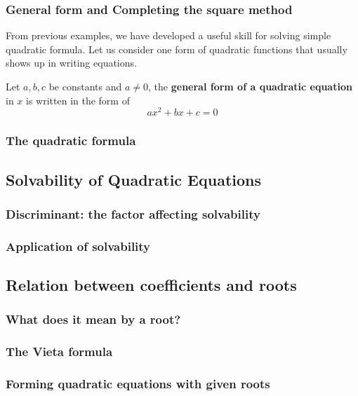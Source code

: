 \documentclass[12pt]{article}
\begin{document}
    \subsubsection*{General form and Completing the square method}

    From previous examples, we have developed a useful skill for solving simple quadratic formula. Let us consider one form of quadratic functions that usually shows up in writing equations.

    Let $a,b,c$ be constants and $a\neq 0$, the \textbf{general form of a quadratic equation} in $x$ is written in the form of $$ax^2+bx+c=0$$

    \subsubsection*{The quadratic formula}

    \subsection{Solvability of Quadratic Equations}

    \subsubsection*{Discriminant: the factor affecting solvability}

    \subsubsection*{Application of solvability}

    \subsection{Relation between coefficients and roots}

    \subsubsection*{What does it mean by a root?}

    \subsubsection*{The Vieta formula}

    \subsubsection*{Forming quadratic equations with given roots}
\end{document}
